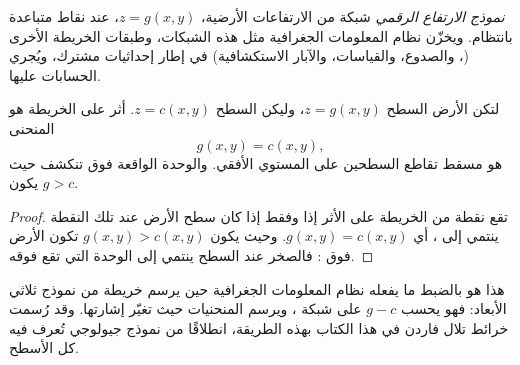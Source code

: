\begin{definition}\label{def:b1:geological-maps:dem}
\emph{نموذج الارتفاع الرقمي} شبكة من الارتفاعات الأرضية، $z = g(x,y)$، عند نقاط متباعدة بانتظام. ويخزّن نظام المعلومات الجغرافية مثل هذه الشبكات، وطبقات الخريطة الأخرى (، والصدوع، والقياسات، والآبار الاستكشافية) في إطار إحداثيات مشترك، ويُجري الحسابات عليها.
\end{definition}

\begin{proposition}\label{prop:b1:geological-maps:intersection}
لتكن الأرض السطح $z = g(x,y)$، وليكن  السطح
$z = c(x,y)$. أثر  على الخريطة هو المنحنى
\[
  g(x,y) = c(x,y),
\]
هو مسقط تقاطع السطحين على المستوي الأفقي. والوحدة الواقعة فوق  تنكشف حيث يكون $g > c$.
\end{proposition}

\begin{proof}
تقع نقطة من الخريطة على الأثر إذا وفقط إذا كان سطح الأرض عند تلك النقطة ينتمي إلى ، أي $g(x,y) = c(x,y)$. وحيث يكون $g(x,y) > c(x,y)$ تكون الأرض فوق : فالصخر عند السطح ينتمي إلى الوحدة التي تقع فوقه.
\end{proof}

\begin{remark}\label{rem:b1:geological-maps:computed}
هذا هو بالضبط ما يفعله نظام المعلومات الجغرافية حين يرسم خريطة من نموذج ثلاثي الأبعاد: فهو يحسب $g - c$ على شبكة ، ويرسم المنحنيات حيث تغيّر إشارتها. وقد رُسمت خرائط تلال فاردن في هذا الكتاب بهذه الطريقة، انطلاقًا من نموذج جيولوجي تُعرف فيه كل الأسطح.
\end{remark}

